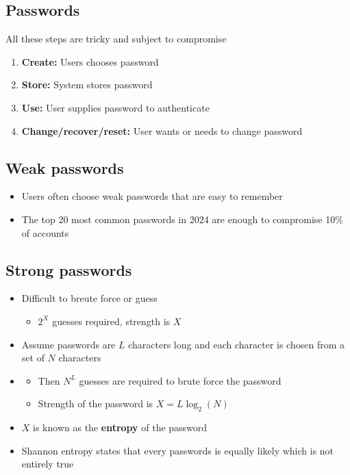 \documentclass[12pt,a4paper]{article}
\begin{document}
\subsection{Passwords}
All these steps are tricky and subject to compromise
\begin{enumerate}
    \item \textbf{Create:} Users chooses password
    \item \textbf{Store:} System stores password
    \item \textbf{Use:} User supplies password to authenticate
    \item \textbf{Change/recover/reset:} User wants or needs to change password
\end{enumerate}

\subsection{Weak passwords}
\begin{itemize}
    \item Users often choose weak passwords that are easy to remember
    \item The top 20 most common passwords in 2024 are enough to compromise 10\% of accounts 
\end{itemize}

\subsection{Strong passwords}
\begin{itemize}
    \item Difficult to breute force or guess
    \begin{itemize}
        \item $2^X$ guesses required, strength is $X$
    \end{itemize}
    \item Assume passwords are $L$ characters long and each character is chosen from a set of $N$ characters
    \item \begin{itemize}
        \item Then $N^L$ guesses are required to brute force the password
        \item Strength of the password is $X = L \log_2(N)$
    \end{itemize}
    \item $X$ is known as the \textbf{entropy} of the password
    \item Shannon entropy states that every passwords is equally likely which is not entirely true
\end{itemize}
\end{document}

